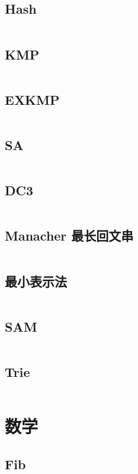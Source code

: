 \documentclass[titlepage,landscape,a4paper,10pt]{article}
\begin{document}
\begin{multicols}{2}
\begin{spacing}{0.8}
\subsection{Hash}
\inputminted{cpp}{Strings/BKDRHash.cpp}

\subsection{KMP}
\inputminted{cpp}{Strings/KMP.cpp}

\subsection{EXKMP}
\inputminted{cpp}{Strings/EXKMP.cpp}

\subsection{SA}
\inputminted{cpp}{Strings/SA.cpp}

\subsection{DC3}
\inputminted{cpp}{Strings/DC3.cpp}

\subsection{Manacher 最长回文串}
\inputminted{cpp}{Strings/Manacher.cpp}

\subsection{最小表示法}
\inputminted{cpp}{Strings/最小表示法.cpp}

\subsection{SAM}
\inputminted{cpp}{Strings/SAM.cpp}

\subsection{Trie}
\inputminted{cpp}{Strings/trie.cpp}

\section{数学}

\subsection{Fib}
\inputminted{cpp}{Math/fib.cpp}


\end{spacing}
\end{multicols}
\end{document}
